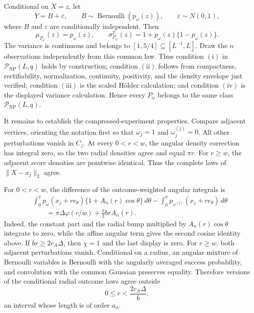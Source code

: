 Conditional on \(X=z\), let
\[
 Y=B+\varepsilon,
 \qquad
 B\sim\operatorname{Bernoulli}(p_\omega(z)),
 \qquad
 \varepsilon\sim N(0,1),
\]
where \(B\) and \(\varepsilon\) are conditionally independent.  Then
\[
 \mu_{P_\omega}(z)=p_\omega(z),
 \qquad
 \sigma_{P_\omega}^2(z)=1+p_\omega(z)\{1-p_\omega(z)\}.
\]
The variance is continuous and belongs to \([1,5/4]\subseteq[L^{-1},L]\).  Draw the \(n\) observations independently from this common law.  Thus condition \(\mathrm{(i)}\) in \(\mathcal P_{\mathrm{NP}}(L,q)\) holds by construction; condition \(\mathrm{(ii)}\) follows from compactness, rectifiability, normalization, continuity, positivity, and the density envelope just verified; condition \(\mathrm{(iii)}\) is the scaled H\"older calculation; and condition \(\mathrm{(iv)}\) is the displayed variance calculation.  Hence every \(P_\omega\) belongs to the same class \(\mathcal P_{\mathrm{NP}}(L,q)\).

It remains to establish the compressed-experiment properties.  Compare adjacent vertices, orienting the notation first so that \(\omega_j=1\) and \(\omega_j^{(j)}=0\).  All other perturbations vanish in \(C_j\).  At every \(0<r<w\), the angular density correction has integral zero, so the two radial densities agree and equal \(\pi r\).  For \(r\geq w\), the adjacent score densities are pointwise identical.  Thus the complete laws of \(\lVert X-x_j\rVert_2\) agree.

For \(0<r<w\), the difference of the outcome-weighted angular integrals is
\[
\begin{aligned}
 &\int_0^\pi p_\omega(x_j+re_\theta)
 \{1+A_n(r)\cos\theta\}\,d\theta
 -\int_0^\pi p_{\omega^{(j)}}(x_j+re_\theta)\,d\theta\\
 &\qquad=\pi\Delta\varphi(r/w)+\frac\pi2brA_n(r).
\end{aligned}
\]
Indeed, the constant part and the radial bump multiplied by \(A_n(r)\cos\theta\) integrate to zero, while the affine angular term gives the second cosine identity above.  If \(br\geq2c_A\Delta\), then \(\chi=1\) and the last display is zero.  For \(r\geq w\), both adjacent perturbations vanish.  Conditional on a radius, an angular mixture of Bernoulli variables is Bernoulli with the angularly averaged success probability, and convolution with the common Gaussian preserves equality.  Therefore versions of the conditional radial outcome laws agree outside
\[
 0\leq r<\frac{2c_A\Delta}{b},
\]
an interval whose length is of order \(a_n\).

